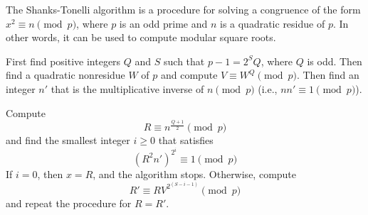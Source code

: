 \documentclass{article}
\begin{document}
The Shanks-Tonelli algorithm is a procedure for solving a congruence of the form $x^2 \equiv n \pmod{p}$, where $p$ is an odd prime and $n$ is a quadratic residue of $p$.  In other words, it can be used to compute modular square roots.

First find positive integers $Q$ and $S$ such that $p - 1 = 2^SQ$, where $Q$ is odd.  Then find a quadratic nonresidue $W$ of $p$ and compute $V \equiv W^Q \pmod{p}$.  Then find an integer $n'$ that is the multiplicative inverse of $n \pmod{p}$ (i.e., $nn' \equiv 1 \pmod{p}$).

Compute
$$R \equiv n^{\frac{Q+1}{2}} \pmod{p}$$
and find the smallest integer $i \geq 0$ that satisfies
$$(R^2n')^{2^i} \equiv 1 \pmod{p}$$
If $i=0$, then $x = R$, and the algorithm stops.  Otherwise, compute
$$R' \equiv RV^{2^{(S-i-1)}} \pmod{p}$$
and repeat the procedure for $R = R'$.
\end{document}
